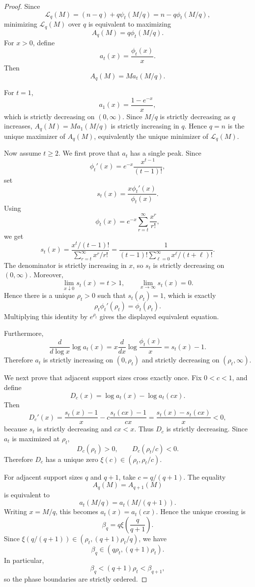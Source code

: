\documentclass[11pt]{article}
\theoremstyle{definition}
\theoremstyle{remark}
\newcommand{\1}{\mathbf 1}
\begin{document}
\begin{proof}
Since
\[
  \mathcal L_q(M)=(n-q)+q\psi_t(M/q)=n-q\phi_t(M/q),
\]
minimizing \(\mathcal L_q(M)\) over \(q\) is equivalent to maximizing
\[
  A_q(M)=q\phi_t(M/q).
\]
For \(x>0\), define
\[
  a_t(x)=\frac{\phi_t(x)}{x}.
\]
Then
\[
  A_q(M)=M a_t(M/q).
\]

For \(t=1\),
\[
  a_1(x)=\frac{1-e^{-x}}{x},
\]
which is strictly decreasing on \((0,\infty)\).  Since \(M/q\) is strictly decreasing as \(q\) increases, \(A_q(M)=M a_1(M/q)\) is strictly increasing in \(q\).  Hence \(q=n\) is the unique maximizer of \(A_q(M)\), equivalently the unique minimizer of \(\mathcal L_q(M)\).

Now assume \(t\ge2\).  We first prove that \(a_t\) has a single peak.  Since
\[
  \phi_t'(x)=e^{-x}\frac{x^{t-1}}{(t-1)!},
\]
set
\[
  s_t(x)=\frac{x\phi_t'(x)}{\phi_t(x)}.
\]
Using
\[
  \phi_t(x)=e^{-x}\sum_{r=t}^{\infty}\frac{x^r}{r!},
\]
we get
\[
  s_t(x)
  =\frac{x^t/(t-1)!}{\sum_{r=t}^{\infty}x^r/r!}
  =\frac{1}{(t-1)!\sum_{\ell=0}^{\infty}x^\ell/(t+\ell)!}.
\]
The denominator is strictly increasing in \(x\), so \(s_t\) is strictly decreasing on \((0,\infty)\).  Moreover,
\[
  \lim_{x\downarrow0}s_t(x)=t>1,
  \qquad
  \lim_{x\to\infty}s_t(x)=0.
\]
Hence there is a unique \(\rho_t>0\) such that \(s_t(\rho_t)=1\), which is exactly
\[
  \rho_t\phi_t'(\rho_t)=\phi_t(\rho_t).
\]
Multiplying this identity by \(e^{\rho_t}\) gives the displayed equivalent equation.

Furthermore,
\[
  \frac{d}{d\log x}\log a_t(x)
  =
  x\frac{d}{dx}\log\frac{\phi_t(x)}{x}
  =s_t(x)-1.
\]
Therefore \(a_t\) is strictly increasing on \((0,\rho_t)\) and strictly decreasing on \((\rho_t,\infty)\).

We next prove that adjacent support sizes cross exactly once.  Fix \(0<c<1\), and define
\[
  D_c(x)=\log a_t(x)-\log a_t(cx).
\]
Then
\[
  D_c'(x)
  =\frac{s_t(x)-1}{x}-c\frac{s_t(cx)-1}{cx}
  =\frac{s_t(x)-s_t(cx)}{x}<0,
\]
because \(s_t\) is strictly decreasing and \(cx<x\).  Thus \(D_c\) is strictly decreasing.  Since \(a_t\) is maximized at \(\rho_t\),
\[
  D_c(\rho_t)>0,
  \qquad
  D_c(\rho_t/c)<0.
\]
Therefore \(D_c\) has a unique zero \(\xi(c)\in(\rho_t,\rho_t/c)\).

For adjacent support sizes \(q\) and \(q+1\), take \(c=q/(q+1)\).  The equality
\[
  A_q(M)=A_{q+1}(M)
\]
is equivalent to
\[
  a_t(M/q)=a_t(M/(q+1)).
\]
Writing \(x=M/q\), this becomes \(a_t(x)=a_t(cx)\).  Hence the unique crossing is
\[
  \beta_q=q\xi\!\left(\frac{q}{q+1}\right).
\]
Since \(\xi(q/(q+1))\in(\rho_t,(q+1)\rho_t/q)\), we have
\[
  \beta_q\in(q\rho_t,(q+1)\rho_t).
\]
In particular,
\[
  \beta_q<(q+1)\rho_t<\beta_{q+1},
\]
so the phase boundaries are strictly ordered.


\end{proof}
\end{document}

